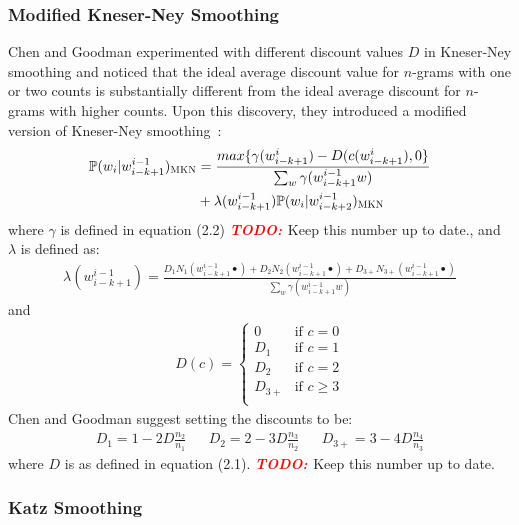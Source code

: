 \documentclass[a4paper, 12pt]{report}
\newcommand{\todo}{\textbf{\textit{\textcolor{red}{TODO: }}}}
\begin{document}
\subsubsection{Modified Kneser-Ney Smoothing}

Chen and Goodman experimented with different discount values $D$ in Kneser-Ney smoothing and noticed that the ideal average discount value for $n$-grams with one or two counts is substantially different from the ideal average discount for $n$-grams with higher counts. Upon this discovery, they introduced a modified version of Kneser-Ney smoothing~\cite{modified_kneser_ney:chen1999}:
\begin{equation*}
\begin{aligned}
	\mathbb{P}(w_i | w_{i - k + 1}^{i - 1})_{\text{\scshape MKN}} &= \frac{max\{\gamma(w_{i - k + 1}^{i}) - D(c(w_{i - k + 1}^{i}), 0\}}{\sum_w \gamma(w_{i - k + 1}^{i - 1}w)} \\
	&+ \lambda(w_{i - k + 1}^{i - 1})\mathbb{P}(w_i | w_{i - k + 2}^{i - 1})_{\text{\scshape MKN}}
\end{aligned}
\end{equation*}
where $\gamma$ is defined in equation (2.2) \todo{Keep this number up to date.}, and $\lambda$ is defined as:
\begin{gather*}
	\lambda(w_{i - k + 1}^{i - 1}) = \frac{D_1N_1(w_{i - k + 1}^{i - 1}\bullet) + D_2N_2(w_{i - k + 1}^{i - 1}\bullet) + D_{3+}N_{3+}(w_{i - k + 1}^{i - 1}\bullet)}{\sum_w \gamma(w_{i - k + 1}^{i - 1}w)}
\end{gather*}
and
\begin{gather*}
	D(c) = \begin{cases}
		0 &\text{if }c = 0 \\
		D_1 &\text{if }c = 1 \\
		D_2 &\text{if }c = 2 \\
		D_{3+} &\text{if }c \geq 3 \\
	\end{cases}
\end{gather*}
Chen and Goodman suggest setting the discounts to be:
\begin{align*}
	D_1 = 1 - 2D\frac{n_2}{n_1} && D_2 = 2 - 3D\frac{n_3}{n_2} && D_{3+} = 3 - 4D\frac{n_4}{n_3}
\end{align*}
where $D$ is as defined in equation (2.1). \todo{Keep this number up to date}.

\subsubsection{Katz Smoothing}
\end{document}
